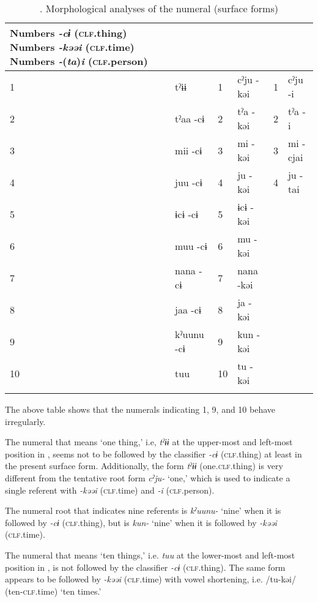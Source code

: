 \begin{table}
\caption{\label{tab:key:50}. Morphological analyses of the numeral (surface forms)}
\begin{tabularx}{\textwidth}{Xl ll ll}
\lsptoprule
Numbers  \textit{{}-cɨ} (\textsc{clf}.thing)    Numbers  \textit{{}-kəəi} (\textsc{clf}.time)    Numbers  \textit{{}-}(\textit{ta})\textit{i} (\textsc{clf}.person)\\
\midrule
1  &tˀɨɨ          &  1 & cˀju  {}-kəi& 1  &  cˀju  {}-i\\
2  &tˀaa    {}-cɨ &  2 & tˀa  {}-kəi & 2  & tˀa  {}-i  \\
3  &mii    {}-cɨ  &  3 & mi  {}-kəi  & 3  & mi  {}-cjai \\
4  &juu    {}-cɨ  &  4 & ju  {}-kəi  & 4  & ju  {}-tai  \\
5  &ɨcɨ    {}-cɨ  &  5 & ɨcɨ  {}-kəi &    &            \\
6  &muu    {}-cɨ  &  6 & mu  {}-kəi  &    &            \\
7  &nana    {}-cɨ &  7 & nana  {}-kəi&    &            \\
8  &jaa    {}-cɨ  &  8 & ja  {}-kəi  &    &            \\
9  &kˀuunu {}-cɨ  &  9 & kun  {}-kəi &    &            \\
10 & tuu          & 10 & tu  {}-kəi  &    &            \\
\lspbottomrule
\end{tabularx}
\end{table}

 The above table shows that the numerals indicating 1, 9, and 10 behave irregularly.

 The numeral that means ‘one thing,’ i.e, \textit{tˀɨɨ} at the upper-most and left-most position in , seems not to be followed by the classifier \textit{{}-cɨ} (\textsc{clf}.thing) at least in the present surface form. Additionally, the form \textit{tˀɨɨ} (one.\textsc{clf}.thing) is very different from the tentative root form \textit{cˀju-} ‘one,’ which is used to indicate a single referent with \textit{-kəəi} (\textsc{clf}.time) and \textit{{}-i} (\textsc{clf}.person).

 The numeral root that indicates nine referents is \textit{kˀuunu-} ‘nine’ when it is followed by \textit{{}-cɨ} (\textsc{clf}.thing), but is \textit{kun-} ‘nine’ when it is followed by \textit{{}-kəəi} (\textsc{clf}.time).

The numeral that means ‘ten things,’ i.e. \textit{tuu} at the lower-most and left-most position in , is not followed by the classifier \textit{{}-cɨ} (\textsc{clf}.thing). The same form appears to be followed by \textit{{}-kəəi} (\textsc{clf}.time) with vowel shortening, i.e. /tu-kəi/ (ten-\textsc{clf}.time) ‘ten times.’

